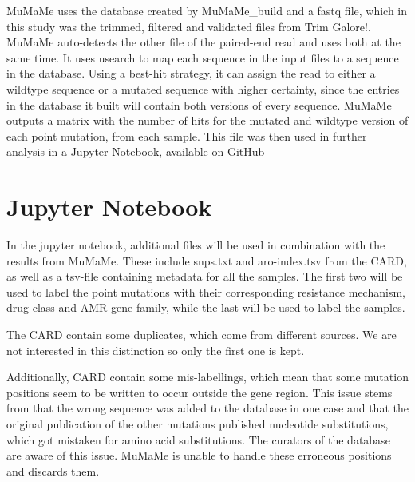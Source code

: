 MuMaMe uses the database created by MuMaMe\_build and a fastq file, which in this study was the trimmed, filtered and validated files from Trim Galore!. MuMaMe auto-detects the other file of the paired-end read and uses both at the same time. It uses usearch\cite{edgar2010SearchClusteringOrders} to map each sequence in the input files to a sequence in the database. Using a best-hit strategy, it can assign the read to either a wildtype sequence or a mutated sequence with higher certainty, since the entries in the database it built will contain both versions of every sequence. 
MuMaMe outputs a matrix with the number of hits for the mutated and wildtype version of each point mutation, from each sample.
This file was then used in further analysis in a Jupyter Notebook, available on \href{TODO: add link to notebook}{GitHub} 

\section{Jupyter Notebook}
In the jupyter notebook, additional files will be used in combination with the results from MuMaMe. These include snps.txt and aro-index.tsv from the CARD, as well as a tsv-file containing metadata for all the samples. The first two will be used to label the point mutations with their corresponding resistance mechanism, drug class and AMR gene family, while the last will be used to label the samples.

The CARD contain some duplicates, which come from different sources. We are not interested in this distinction so only the first one is kept. 

Additionally, CARD contain some mis-labellings, which mean that some mutation positions seem to be written to occur outside the gene region.
This issue stems from that the wrong sequence was added to the database in one case and that the original publication of the other mutations published nucleotide substitutions, which got mistaken for amino acid substitutions.
The curators of the database are aware of this issue\cite{alcockLengthDiscrepancyProtein}.
MuMaMe is unable to handle these erroneous positions and discards them.

